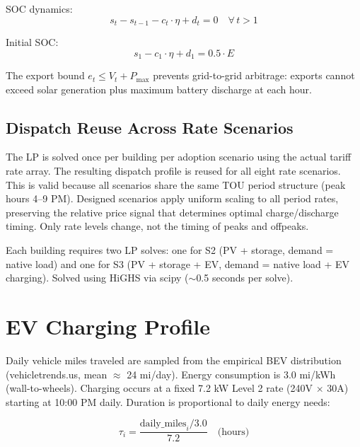 \documentclass[9pt]{article}
\begin{document}
SOC dynamics:
\begin{equation}
s_t - s_{t-1} - c_t \cdot \eta + d_t = 0 \quad \forall \, t > 1
\end{equation}

Initial SOC:
\begin{equation}
s_1 - c_1 \cdot \eta + d_1 = 0.5 \cdot E
\end{equation}

The export bound $e_t \leq V_t + P_{\max}$ prevents grid-to-grid arbitrage: exports cannot exceed solar generation plus maximum battery discharge at each hour.

\subsection{Dispatch Reuse Across Rate Scenarios}

The LP is solved once per building per adoption scenario using the actual tariff rate array. The resulting dispatch profile is reused for all eight rate scenarios. This is valid because all scenarios share the same TOU period structure (peak hours 4--9 PM). Designed scenarios apply uniform scaling to all period rates, preserving the relative price signal that determines optimal charge/discharge timing. Only rate levels change, not the timing of peaks and offpeaks.

Each building requires two LP solves: one for S2 (PV + storage, demand = native load) and one for S3 (PV + storage + EV, demand = native load + EV charging). Solved using HiGHS via scipy ($\sim$0.5 seconds per solve).

\section{EV Charging Profile}
\label{sec:ev}

Daily vehicle miles traveled are sampled from the empirical BEV distribution (vehicletrends.us, mean $\approx$ 24 mi/day). Energy consumption is 3.0 mi/kWh (wall-to-wheels). Charging occurs at a fixed 7.2 kW Level 2 rate (240V $\times$ 30A) starting at 10:00 PM daily. Duration is proportional to daily energy needs:

\begin{equation}
\tau_i = \frac{\text{daily\_miles}_i / 3.0}{7.2} \quad \text{(hours)}
\end{equation}
\end{document}
